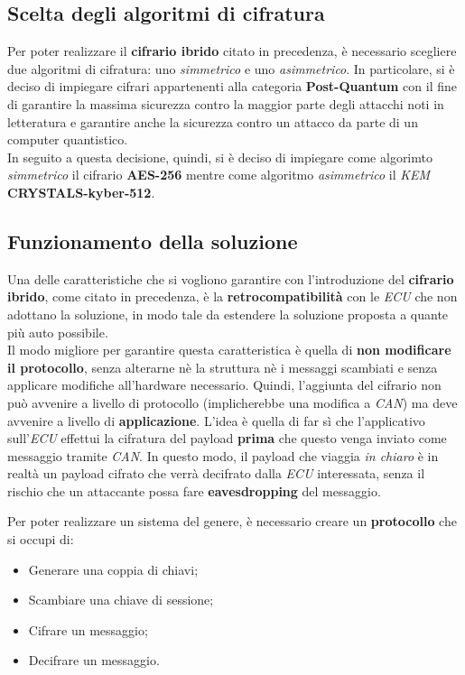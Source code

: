 \subsection{Scelta degli algoritmi di cifratura}
Per poter realizzare il \textbf{cifrario ibrido} citato in precedenza, è necessario scegliere due algoritmi di cifratura: uno \emph{simmetrico} e uno \emph{asimmetrico}. In particolare, si è deciso di impiegare cifrari appartenenti alla categoria \textbf{Post-Quantum} con il fine di garantire la massima sicurezza contro la maggior parte degli attacchi noti in letteratura e garantire anche la sicurezza contro un attacco da parte di un computer quantistico.\\
In seguito a questa decisione, quindi, si è deciso di impiegare come algorimto \emph{simmetrico} il cifrario \textbf{AES-256} mentre come algoritmo \emph{asimmetrico} il \emph{KEM} \textbf{CRYSTALS-kyber-512}.

\subsection{Funzionamento della soluzione}
Una delle caratteristiche che si vogliono garantire con l'introduzione del \textbf{cifrario ibrido}, come citato in precedenza, è la \textbf{retrocompatibilità} con le \emph{ECU} che non adottano la soluzione, in modo tale da estendere la soluzione proposta a quante più auto possibile.\\
Il modo migliore per garantire questa caratteristica è quella di \textbf{non modificare il protocollo}, senza alterarne nè la struttura nè i messaggi scambiati e senza applicare modifiche all'hardware necessario. Quindi, l'aggiunta del cifrario non può avvenire a livello di protocollo (implicherebbe una modifica a \emph{CAN}) ma deve avvenire a livello di \textbf{applicazione}. L'idea è quella di far sì che l'applicativo sull'\emph{ECU} effettui la cifratura del payload \textbf{prima} che questo venga inviato come messaggio tramite \emph{CAN}. In questo modo, il payload che viaggia \emph{in chiaro} è in realtà un payload cifrato che verrà decifrato dalla \emph{ECU} interessata, senza il rischio che un attaccante possa fare \textbf{eavesdropping} del messaggio.

Per poter realizzare un sistema del genere, è necessario creare un \textbf{protocollo} che si occupi di:
\begin{itemize}
    \item Generare una coppia di chiavi;
    \item Scambiare una chiave di sessione;
    \item Cifrare un messaggio;
    \item Decifrare un messaggio.
\end{itemize}

